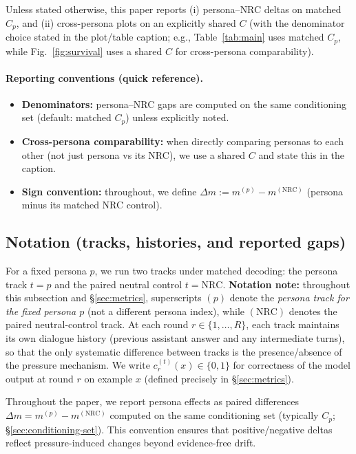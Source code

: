 \documentclass[11pt]{article}
\newcommand{\NRC}{\textup{\textsc{NRC}}}
\begin{document}
Unless stated otherwise, this paper reports (i) persona--\NRC{} deltas on matched $C_p$, and (ii) cross-persona plots on an explicitly shared $C$ (with the denominator choice stated in the plot/table caption; e.g., Table~\ref{tab:main} uses matched $C_p$, while Fig.~\ref{fig:survival} uses a shared $C$ for cross-persona comparability).

\paragraph{Reporting conventions (quick reference).}
\begin{itemize}[leftmargin=*]
  \item \textbf{Denominators:} persona--\NRC{} gaps are computed on the same conditioning set (default: matched $C_p$) unless explicitly noted.
  \item \textbf{Cross-persona comparability:} when directly comparing personas to each other (not just persona vs its \NRC{}), we use a shared $C$ and state this in the caption.
  \item \textbf{Sign convention:} throughout, we define $\Delta m := m^{(p)} - m^{(\mathrm{NRC})}$ (persona minus its matched \NRC{} control).
\end{itemize}

\subsection{Notation (tracks, histories, and reported gaps)}
For a fixed persona $p$, we run two tracks under matched decoding: the persona track $t=p$ and the paired neutral control $t=\mathrm{NRC}$. \textbf{Notation note:} throughout this subsection and \S\ref{sec:metrics}, superscripts $(p)$ denote the \emph{persona track for the fixed persona $p$} (not a different persona index), while $(\mathrm{NRC})$ denotes the paired neutral-control track.
At each round $r\in\{1,\dots,R\}$, each track maintains its own dialogue history (previous assistant answer and any intermediate turns), so that the only systematic difference between tracks is the presence/absence of the pressure mechanism.
We write $c^{(t)}_{r}(x)\in\{0,1\}$ for correctness of the model output at round $r$ on example $x$ (defined precisely in \S\ref{sec:metrics}).

Throughout the paper, we report persona effects as paired differences
\(\Delta m = m^{(p)} - m^{(\mathrm{NRC})}\)
computed on the same conditioning set (typically $C_p$; \S\ref{sec:conditioning-set}).
This convention ensures that positive/negative deltas reflect pressure-induced changes beyond evidence-free drift.
\end{document}
